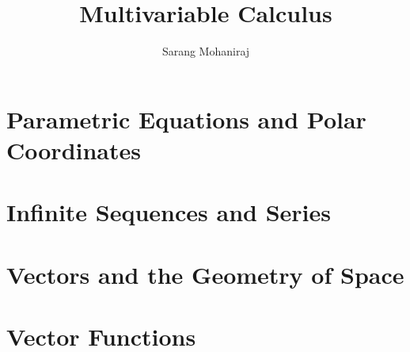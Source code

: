 \title{Multivariable Calculus}
\author{Sarang Mohaniraj}

\maketitle

\tableofcontents

\chapter{Parametric Equations and Polar Coordinates}
  
  
  
  
  
  

\chapter{Infinite Sequences and Series}
  
  
  
  
  
  
  
  
  
  
  
  

\chapter{Vectors and the Geometry of Space}
  
  
  
  
  
  
  

\chapter{Vector Functions}
  
  
  
  

